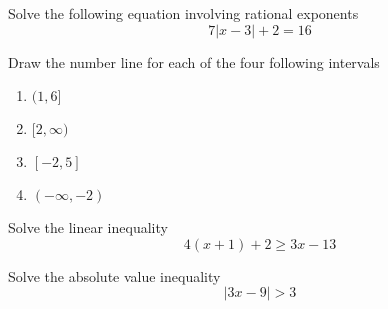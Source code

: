 \documentclass[addpoints,12pt]{exam}
\begin{document}
\begin{questions}
	 \question Solve the following equation involving rational exponents 
	    \[
	  7|x-3|+2=16
	 \]

\question Draw the number line for each of the four following intervals 
\begin{enumerate}

	\item $(1,6]$
	\item $[2,\infty)$
	\item $[-2,5]$
	\item $(-\infty,-2)$

\end{enumerate}

\question Solve the linear inequality
   \[
4(x+1)+2\geq 3x-13
\]

\question Solve the absolute value inequality 
\[
|3x-9| > 3
\]

\question 


\end{questions}
\end{document}
